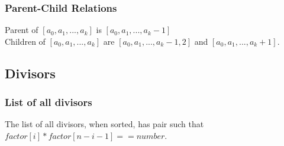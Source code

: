 \subsubsection{Parent-Child Relations}
Parent of $ [a_0, a_1, ..., a_k] $ is $ [a_0, a_1, ..., a_k-1] $ \\
Children of $[a_0, a_1, ..., a_k]$ are $[a_0, a_1, ..., a_k-1, 2]$ and $[a_0, a_1, ..., a_k+1]$.


\subsection{Divisors}

\subsubsection{List of all divisors}
The list of all divisors, when sorted, has pair such that $factor[i] * factor[n-i-1] == number$.